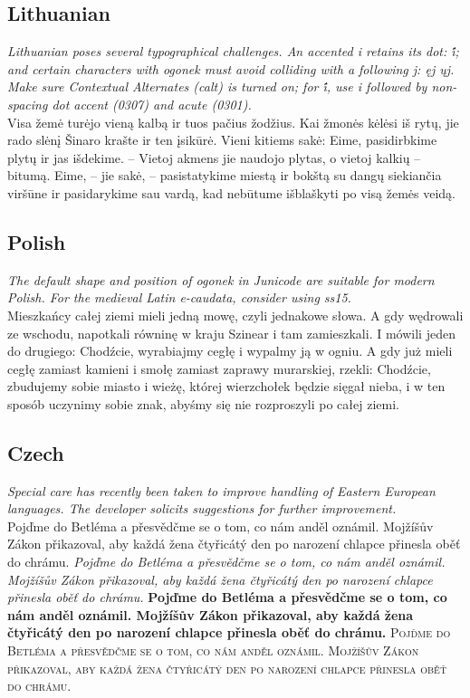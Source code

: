 \documentclass[12pt,a4paper,openany]{book}
\begin{document}
\subsection*{Lithuanian}

{\small\itshape Lithuanian poses several typographical challenges. An
  accented i retains its dot: i̇́; and certain characters with ogonek
  must avoid colliding with a following j:
  {\upshape{} ęj ųj}. Make sure
  Contextual Alternates (calt) is turned on; for i̇́, use i followed
  by non-spacing dot accent (0307) and acute (0301).}\\[1ex]
Visa žemė turėjo vieną kalbą ir tuos pačius žodžius.  Kai žmonės
kėlėsi iš rytų, jie rado slėnį Šinaro krašte ir ten įsikūrė.  Vieni
kitiems sakė: Eime, pasidirbkime plytų ir jas išdekime. – Vietoj
akmens jie naudojo plytas, o vietoj kalkių – bitumą.  Eime, – jie
sakė, – pasistatykime miestą ir bokštą su dangų siekiančia viršūne ir
pasidarykime sau vardą, kad nebūtume išblaškyti po visą žemės veidą.

\subsection*{Polish}
{\small\itshape The default shape and position of ogonek in Junicode are suitable
for modern Polish. For the medieval Latin e-caudata, consider using
ss15.}\\[1ex]
Mieszkańcy całej ziemi mieli jedną mowę, czyli jednakowe słowa.  A
gdy wędrowali ze wschodu, napotkali równinę w kraju Szinear i tam
zamieszkali.  I mówili jeden do drugiego: Chodźcie, wyrabiajmy cegłę
i wypalmy ją w ogniu. A gdy już mieli cegłę zamiast kamieni i smołę
zamiast zaprawy murarskiej, rzekli: Chodźcie, zbudujemy sobie miasto
i wieżę, której wierzchołek będzie sięgał nieba, i w ten sposób
uczynimy sobie znak, abyśmy się nie rozproszyli po całej ziemi.

\subsection*{Czech}
{\small\itshape Special care has recently been taken to improve
  handling
of Eastern European languages. The developer solicits suggestions for
further improvement.}\\
Pojďme do Betléma a přesvědčme
se o tom, co nám anděl oznámil. Mojžíšův Zákon přikazoval, aby každá
žena čtyřicátý den po narození chlapce přinesla oběť do chrámu.
{\itshape Pojďme do Betléma a přesvědčme
se o tom, co nám anděl oznámil. Mojžíšův Zákon přikazoval, aby každá
žena čtyřicátý den po narození chlapce přinesla oběť do chrámu.}
{\bfseries Pojďme do Betléma a přesvědčme
se o tom, co nám anděl oznámil. Mojžíšův Zákon přikazoval, aby každá
žena čtyřicátý den po narození chlapce přinesla oběť do chrámu.}
{\scshape Pojďme do Betléma a přesvědčme
se o tom, co nám anděl oznámil. Mojžíšův Zákon přikazoval, aby každá
žena čtyřicátý den po narození chlapce přinesla oběť do chrámu.}
\end{document}
